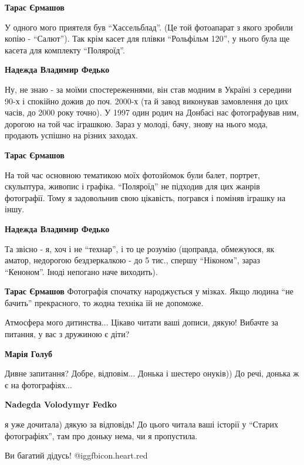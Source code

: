 \begin{itemize}
\begin{itemize}
\textbf{Тарас Єрмашов} 

У одного мого приятеля був \enquote{Хассельблад}. (Це той фотоапарат з якого зробили
копію - \enquote{Салют}). Так крім касет для плівки \enquote{Рольфільм 120}, у нього була ще
касета для комплекту \enquote{Поляроїд}.


\textbf{Надежда Владимир Федько} 

Ну, не знаю - за моїми спостереженнями, він став модним в Україні з середини
90-х і спокійно дожив до поч. 2000-х (та й завод виконував замовлення до цих
часів, до 2000 року точно). У 1997 один родич на Донбасі нас фотографував ним,
дорогою на той час іграшкою. Зараз у молоді, бачу, знову на нього мода,
продають успішно на різних заходах.


\textbf{Тарас Єрмашов} 

На той час основною тематикою моїх фотозйомок були балет, портрет, скульптура,
живопис і графіка. \enquote{Поляроїд} не підходив для цих жанрів фотографії. Тому я
задовольнив свою цікавість, погрався і поміняв іграшку на іншу.


\textbf{Надежда Владимир Федько} 

Та звісно - я, хоч і не \enquote{технар}, і то це розумію (щоправда, обмежуюся, як
аматор, недорогою бездзеркалкою - до 5 тис., спершу \enquote{Ніконом}, зараз \enquote{Кеноном}.
Іноді непогано наче виходить).


\textbf{Тарас Єрмашов} Фотографія спочатку народжується у мізках. Якщо людина \enquote{не бачить} прекрасного, то жодна техніка їй не допоможе.
\end{itemize} %

Атмосфера мого дитинства...
Цікаво читати ваші дописи, дякую!
Вибачте за питання, у вас з дружиною є діти?

\begin{itemize} %
\textbf{Марія Голуб} 

Дивне запитання? Добре, відповім... Донька і шестеро онуків)) До речі, донька ж є на фотографіях...

\textbf{Nadegda Volodymyr Fedko} 

я уже дочитала) дякую за відповідь! До цього читала ваші історії у \enquote{Старих
фотографіях}, там про доньку нема, чи я пропустила.

Ви багатий дідусь! @igg{fbicon.heart.red}


\end{itemize}
\end{itemize}
